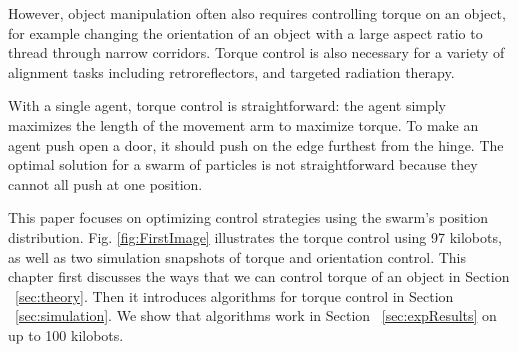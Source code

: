 However, object manipulation often also requires controlling torque on an object, for example changing the orientation of an object with a large aspect ratio to thread through narrow corridors.
Torque control  is also necessary for a variety of alignment tasks including retroreflectors, and targeted radiation therapy.

With a single agent, torque control is straightforward: the agent simply maximizes the length of the movement arm to maximize torque. To make an agent push open a door, it should push on the edge furthest from the hinge. 
The optimal solution for a swarm of particles is not straightforward because they cannot all push at one position.

This paper focuses on optimizing control strategies using the swarm's position distribution. 
Fig. \ref{fig:FirstImage} illustrates the torque control using 97 kilobots, as well as two simulation snapshots of torque and orientation control.
This chapter first discusses the ways that we can control torque of an object in Section ~\ref{sec:theory}. Then it introduces algorithms for torque control in Section ~\ref{sec:simulation}. We show that algorithms work in Section ~\ref{sec:expResults} on up to 100 kilobots.





